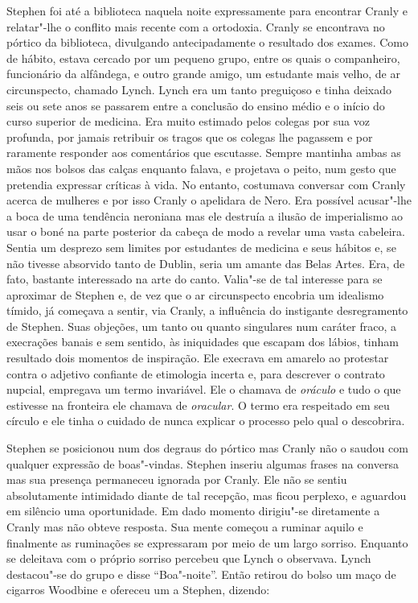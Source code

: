 Stephen foi até a biblioteca naquela noite expressamente para encontrar Cranly
e relatar"-lhe o conflito mais recente com a ortodoxia.  Cranly se
encontrava no pórtico da biblioteca, divulgando antecipadamente o resultado dos
exames.  Como de hábito, estava cercado por um pequeno grupo, entre os quais o
companheiro, funcionário da alfândega, e outro grande amigo, um estudante mais
velho, de ar circunspecto, chamado Lynch.  Lynch era um tanto preguiçoso e
tinha deixado seis ou sete anos se passarem entre a conclusão do ensino médio e
o início do curso superior de medicina.  Era muito estimado pelos colegas por
sua voz profunda, por jamais retribuir os tragos que os colegas lhe pagassem e
por raramente responder aos comentários que escutasse.  Sempre mantinha ambas
as \label{maos"-nos} mãos nos bolsos das calças enquanto falava, e projetava o peito, num gesto
que pretendia expressar críticas à vida.  No entanto, costumava conversar com
Cranly acerca de mulheres e por isso Cranly o apelidara de Nero.  Era possível
acusar"-lhe a boca de uma tendência neroniana mas ele destruía a ilusão de
imperialismo ao usar o boné na parte posterior da cabeça de modo a revelar uma
vasta cabeleira.  Sentia um desprezo sem limites por estudantes de medicina e
seus hábitos e, se não tivesse absorvido tanto de Dublin, seria um amante das
Belas Artes.  Era, de fato, bastante interessado na arte do canto.
Valia"-se de tal interesse para se aproximar de Stephen e, de vez que o ar
circunspecto encobria um \label{idealismo"-timido} idealismo tímido, já começava a sentir, via Cranly,
a influência do instigante desregramento de Stephen.  Suas objeções, um tanto
ou quanto singulares num caráter fraco, a execrações banais e sem sentido, às
\label{iniquidades"-que} iniquidades que escapam dos lábios, tinham resultado dois momentos de
inspiração.  Ele \label{execrava"-em} execrava em amarelo ao protestar contra o adjetivo confiante
de etimologia incerta e, para descrever o contrato nupcial, empregava um termo
invariável.  Ele o chamava de \textit{oráculo} e tudo o que estivesse na
fronteira ele chamava de \textit{oracular}.  O termo era respeitado em seu
círculo e ele tinha o cuidado de nunca explicar o processo pelo qual o
descobrira.

Stephen se posicionou num dos degraus do pórtico mas Cranly não o saudou com
qualquer expressão de boas"-vindas.  Stephen inseriu algumas frases na conversa
mas sua presença permaneceu \label{ignorada"-por} ignorada por Cranly.  Ele não se sentiu
absolutamente intimidado diante de tal recepção, mas ficou perplexo, e aguardou
em silêncio uma oportunidade.  Em dado momento dirigiu"-se diretamente a Cranly
mas não obteve resposta.  Sua mente começou a ruminar aquilo e finalmente as
ruminações se expressaram por meio de um largo sorriso.  Enquanto se deleitava
com o próprio sorriso percebeu que Lynch o observava.  Lynch destacou"-se do
grupo e disse “Boa"-noite”.  Então retirou do bolso um maço de cigarros Woodbine
e ofereceu um a Stephen, dizendo:

